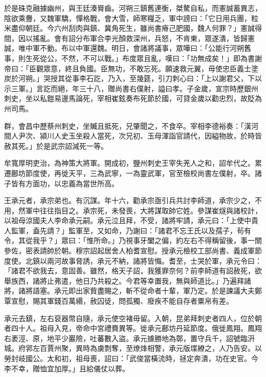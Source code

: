 \begin{pinyinscope}
 於是硃克融據幽州，與王廷湊脣齒。河朔三鎮舊連衡，桀驁自私，而憲誠蓄異志，陰欲乘釁，又魏軍驕，憚格戰，會大雪，師寒糧乏，軍中謗曰：「它日用兵團，粒米盡仰朝廷。今六州刮肉與鎮、冀角死生，雖尚書瘠己肥國，魏人何罪？」憲誠得間，因以搖亂。會有詔分布軍合李光顏救深州，兵怒，不肯東，眾遂潰，皆歸憲誠，唯中軍不動。布以中軍還魏。明日，會諸將議事，眾嘩曰：「公能行河朔舊事，則生死從公，不然，不可以戰。」布度眾且亂，嘆曰：「功無成矣！」即為書謝帝曰：「臣觀眾意，終且負國。臣無功，不敢忘死。願速救元翼，毋使忠臣義士塗炭於河朔。」哭授其從事李石訖，乃入，至幾筵，引刀刺心曰：「上以謝君父，下以示三軍。」言訖而絕，年三十八，贈尚書右僕射，謚曰孝。子金歲，宣宗時歷銀州刺史，坐以私鎧易邊馬論死，宰相崔鉉奏布死節於國，可貸金歲以勸忠烈，故貶為州司馬。



 群，會昌中歷蔡州刺史，坐贓且抵死，兄肇聞之，不食卒。宰相李德裕奏：「漢河間人尹次、潁川人史玉坐殺人當死，次兄初、玉母渾詣官請代，因縊物故，於時皆赦其死。」於是武宗詔減死一等。



 牟寬厚明吏治，為神策大將軍。開成初，鹽州刺史王宰失羌人之和，詔牟代之。累遷鄜坊節度使，再徙天平，三為武寧，一為靈武軍，官至檢校尚書左僕射，卒。諸子皆有方面功，以忠義為當世所高。



 王承元者，承宗弟也。有沉謀。年十六，勸承宗亟引兵共討李師道，承宗少之，不用，然軍中往往指目之。承宗死，未發喪，大將謀取帥它姓。參謀崔燧與諸校計，以祖母涼國夫人李命承元嗣。承元泣且拜，不受，諸將牢請，承元曰：「上使中貴人監軍，盍先請？」監軍至，又如命，乃謝曰：「諸君不忘王氏以及孺子，茍有令，其從我乎？」眾曰：「惟所命。」乃視事牙闔之偏，約左右不得稱留後，事一關參佐，密表請帥於朝。穆宗詔起居舍人柏耆宣慰。授承元檢校工部尚書、義成軍節度使。北鎮以兩河故事脅誘，承元不納，諸將皆悔。耆至，士哭於軍，承元令曰：「諸君不欲我去，意固善。雖然，格天子詔，我獲罪奈何？前李師道有詔赦死，欲舉族西，諸將止弗遣，他日乃共殺之。今君等幸置我，無與師道比。」乃遍拜諸將，諸將語塞。承元即出家貲盡賜之，斬不從命者十輩，軍乃定。於是諫議大夫鄭覃宣慰，賜其軍錢百萬緡，赦囚徒，問孤獨、廢疾不能自存者粟帛有差。



 承元去鎮，左右裒器幣自隨，承元使空褚毋留。入朝，昆弟拜刺史者四人，位於朝者四十人。祖母入見，帝命中宮禮賚異等。徙承元鄜坊丹延節度。俄徙鳳翔。鳳翔右袤涇、原，地平少巖險，吐蕃數入盜。承元據勝地為鄣，置守兵千，詔號臨汧城。府郛左百賈州聚，異時為虜剽奪，至燎烽相警，承元版堞繚之，人乃告安。以勞封岐國公。太和初，祖母喪，詔曰：「武俊當橫流時，拯定奔潰，功在史官。今李不幸，贈恤宜加厚。」且給儀仗以葬。




\end{pinyinscope}
